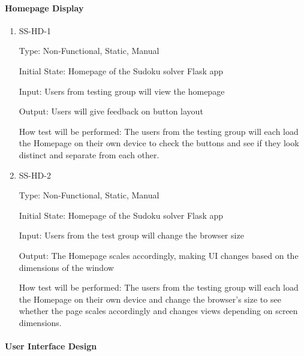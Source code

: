 \documentclass[11pt]{article}
\begin{document}
\paragraph{Homepage Display}

\begin{enumerate}

\item{SS-HD-1\\}

Type: Non-Functional, Static, Manual
					
Initial State: Homepage of the Sudoku solver Flask app
					
Input: Users from testing group will view the homepage
					
Output: Users will give feedback on button layout
					
How test will be performed: The users from the testing group will each load the Homepage on their own device to check the buttons and see if they look distinct and separate from each other.
					
\item{SS-HD-2\\}

Type: Non-Functional, Static, Manual
					
Initial State: Homepage of the Sudoku solver Flask app
					
Input: Users from the test group will change the browser size
					
Output: The Homepage scales accordingly, making UI changes based on the dimensions of the window
					
How test will be performed: The users from the testing group will each load the Homepage on their own device and change the browser's size to see whether the page scales accordingly and changes views depending on screen dimensions.

\end{enumerate}

\paragraph{User Interface Design}
\end{document}
